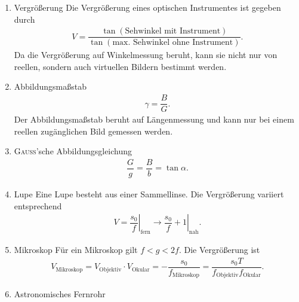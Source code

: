 \begin{enumerate}[label=--]
        \item Vergrößerung \hspace{25pt}
                Die Vergrößerung eines optischen Instrumentes ist gegeben durch
                \begin{align} 
                        V=\dfrac{\tan \left(\text{Sehwinkel mit Instrument}\right)}{\tan \left(\text{max.\ Sehwinkel ohne Instrument}\right)}
                .\end{align} 
                Da die Vergrößerung auf Winkelmessung beruht, kann sie nicht nur von reellen, sondern auch virtuellen Bildern bestimmt werden.
        \item Abbildungsmaßstab \hspace{25pt}
                \begin{align} 
                        \gamma =\dfrac{B}{G}
                .\end{align} 
                Der Abbildungsmaßstab beruht auf Längenmessung und kann nur bei einem reellen zugänglichen Bild gemessen werden.
        \item \textsc{Gauß}'sche Abbildungsgleichung \hspace{25pt}
                \begin{align} 
                        \dfrac{G}{g}=\dfrac{B}{b}=\tan \alpha 
                .\end{align} 
        \item Lupe \hspace{25pt}
                Eine Lupe besteht aus einer Sammellinse.
                Die Vergrößerung variiert entsprechend
                \begin{align} 
                        V=\left.\dfrac{s_0}{f}\right|_\text{fern}\rightarrow \left.\dfrac{s_0}{f}+1\right|_\text{nah}
                .\end{align} 
        \item Mikroskop \hspace{25pt}
                Für ein Mikroskop gilt $f<g<2f$.
                Die Vergrößerung ist
                \begin{align} 
                        V_\text{Mikroskop}=V_\text{Objektiv}\cdot V_\text{Okular}=-\dfrac{s_0}{f_\text{Mikroskop}}=\dfrac{s_0T}{f_\text{Objektiv}f_\text{Okular}}
                .\end{align} 
        \item Astronomisches Fernrohr \hspace{25pt}

\end{enumerate}
